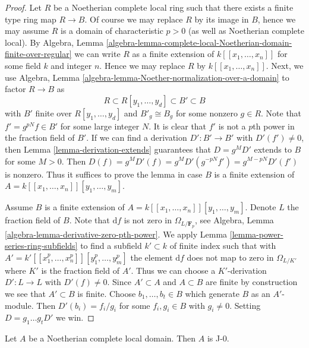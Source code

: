 \begin{proof}
Let $R$ be a Noetherian complete local ring such that there exists
a finite type ring map $R \to B$. Of course we may replace $R$ by
its image in $B$, hence we may assume $R$ is a domain of characteristic
$p > 0$ (as well as Noetherian complete local). By Algebra, Lemma
\ref{algebra-lemma-complete-local-Noetherian-domain-finite-over-regular}
we can write $R$ as a finite extension of $k[[x_1, \ldots, x_n]]$ for some
field $k$ and integer $n$. Hence we may replace $R$ by $k[[x_1, \ldots, x_n]]$.
Next, we use
Algebra, Lemma \ref{algebra-lemma-Noether-normalization-over-a-domain}
to factor $R \to B$ as
$$
R \subset R[y_1, \ldots, y_d] \subset B' \subset B
$$
with $B'$ finite over $R[y_1, \ldots, y_d]$ and $B'_g \cong B_g$
for some nonzero $g \in R$. Note that $f' = g^{pN} f \in B'$ for some
large integer $N$. It is clear that $f'$ is not a $p$th power in
the fraction field of $B'$. If we can find a derivation
$D' : B' \to B'$ with $D'(f') \not = 0$, then
Lemma \ref{lemma-derivation-extends}
guarantees that $D = g^MD'$ extends to $B$ for some $M > 0$. Then
$D(f) = g^MD'(f) = g^MD'(g^{-pN}f') = g^{M - pN}D'(f')$ is nonzero.
Thus it suffices to prove the lemma in case
$B$ is a finite extension of $A = k[[x_1, \ldots, x_n]][y_1, \ldots, y_m]$.

\medskip\noindent
Assume $B$ is a finite extension of
$A = k[[x_1, \ldots, x_n]][y_1, \ldots, y_m]$.
Denote $L$ the fraction field of $B$.
Note that $\text{d}f$ is not zero in $\Omega_{L/\mathbf{F}_p}$, see
Algebra, Lemma \ref{algebra-lemma-derivative-zero-pth-power}.
We apply Lemma \ref{lemma-power-series-ring-subfields} to find a subfield
$k' \subset k$ of finite index such that with
$A' = k'[[x_1^p, \ldots, x_n^p]][y_1^p, \ldots, y_m^p]$
the element $\text{d}f$ does not map to zero in $\Omega_{L/K'}$
where $K'$ is the fraction field of $A'$.
Thus we can choose a $K'$-derivation $D' : L \to L$
with $D'(f) \not = 0$. Since $A' \subset A$ and $A \subset B$ are
finite by construction we see that $A' \subset B$ is finite.
Choose $b_1, \ldots, b_t \in B$ which generate $B$ as an $A'$-module.
Then $D'(b_i) = f_i/g_i$ for some $f_i, g_i \in B$ with $g_i \not = 0$.
Setting $D = g_1 \ldots g_t D'$ we win.
\end{proof}

\begin{lemma}
\label{lemma-complete-Noetherian-domain-J-0}
Let $A$ be a Noetherian complete local domain. Then $A$ is J-0.
\end{lemma}

